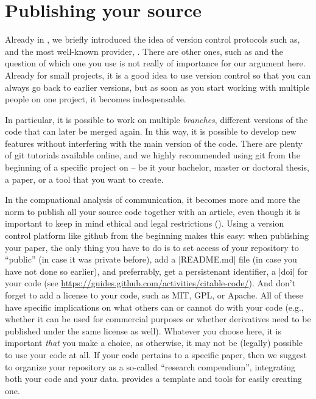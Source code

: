 \section{Publishing your source}
\label{sec:publishingsource}

Already in , we briefly introduced the idea of
version control protocols such as, and the most well-known
provider, . There are other ones, such as 
and the question of which one you use is not really of importance for our
argument here. Already for small projects, it is a good idea to use
version control so that you can always go back to earlier versions,
but as soon as you start working with multiple people on one project,
it becomes indespensable.

In particular, it is possible to work on multiple \emph{branches},
different versions of the code that can later be merged again. In this
way, it is possible to develop new features without interfering with
the main version of the code. There are plenty of git tutorials
available online, and we highly recommended using git from the
beginning of a specific project on -- be it your bachelor, master or doctoral thesis, a paper, or a tool that you want to create.

In the compuational analysis of communication, it becomes more and
more the norm to publish all your source code together with an
article, even though it is important to keep in mind ethical and legal
restrictions (\cite{VanAtteveldt2019}). Using a version control
platform like github from the beginning makes this easy: when
publishing your paper, the only thing you have to do is to set access
of your repository to ``public'' (in case it was private before), add
a |README.md| file (in case you have not done so earlier), and
preferrably, get a persistenant identifier, a |doi| for your
code (see \url{https://guides.github.com/activities/citable-code/}).
And don't forget to add a license to your code, such as MIT, GPL, or
Apache. All of these have specific implications on what others can or
cannot do with your code (e.g., whether it can be used for commercial
purposes or whether derivatives need to be published under the same license as well). Whatever you choose here, it is important \emph{that} you make a choice, as otherwise, it may not be (legally) possible to use
your code at all. 
If your code pertains to a specific paper, then we suggest to organize
your repository as a so-called ``research compendium'', integrating
both your code and your data.
\cite{compendium} provides a template and tools for easily creating one.

